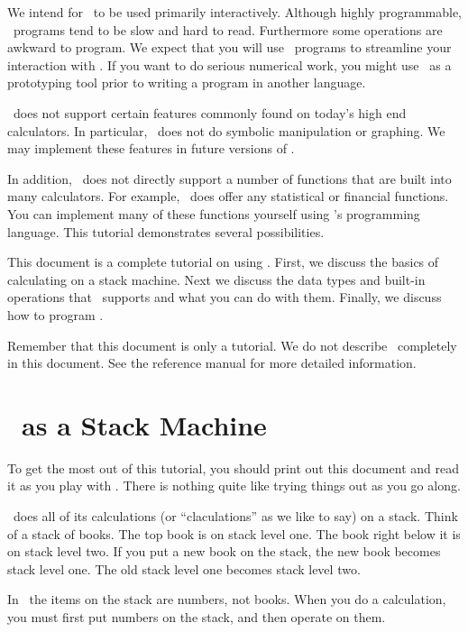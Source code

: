 \documentclass{report}
\begin{document}
We intend for \CLAC\ to be used primarily interactively. Although highly programmable, \CLAC\
programs tend to be slow and hard to read. Furthermore some operations are awkward to program.
We expect that you will use \CLAC\ programs to streamline your interaction with \CLAC. If you
want to do serious numerical work, you might use \CLAC\ as a prototyping tool prior to writing a
program in another language.

\CLAC\ does not support certain features commonly found on today's high end calculators. In
particular, \CLAC\ does not do symbolic manipulation or graphing. We may implement these
features in future versions of \CLAC.

In addition, \CLAC\ does not directly support a number of functions that are built into many
calculators. For example, \CLAC\ does offer any statistical or financial functions. You can
implement many of these functions yourself using \CLAC's programming language. This tutorial
demonstrates several possibilities.

This document is a complete tutorial on using \CLAC. First, we discuss the basics of calculating
on a stack machine. Next we discuss the data types and built-in operations that \CLAC\ supports
and what you can do with them. Finally, we discuss how to program \CLAC.

Remember that this document is only a tutorial. We do not describe \CLAC\ completely in this
document. See the reference manual for more detailed information.

\chapter{\CLAC\ as a Stack Machine}

To get the most out of this tutorial, you should print out this document and read it as you play
with \CLAC. There is nothing quite like trying things out as you go along.

\CLAC\ does all of its calculations (or ``claculations'' as we like to say) on a stack. Think of
a stack of books. The top book is on stack level one. The book right below it is on stack level
two. If you put a new book on the stack, the new book becomes stack level one. The old stack
level one becomes stack level two.

In \CLAC\ the items on the stack are numbers, not books. When you do a calculation, you must
first put numbers on the stack, and then operate on them.
\end{document}
